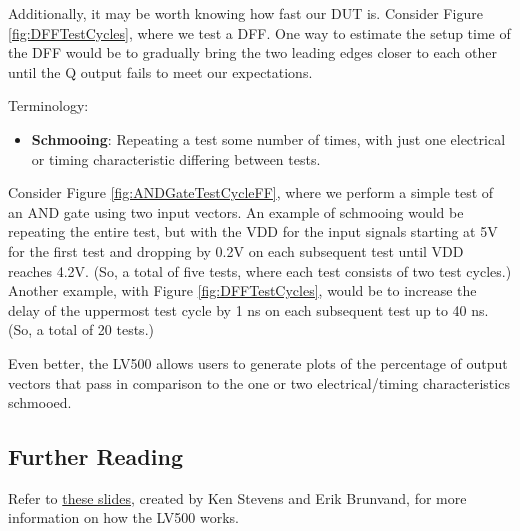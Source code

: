 Additionally, it may be worth knowing how fast our DUT is. Consider Figure \ref{fig:DFFTestCycles}, where we test a DFF. One way to estimate the setup time of the DFF would be to gradually bring the two leading edges closer to each other until the Q output fails to meet our expectations.

\begin{flushleft}
Terminology: 
\begin{itemize}
\item \textbf{Schmooing}: Repeating a test some number of times, with just one electrical or timing characteristic differing between tests.
\end{itemize}
\end{flushleft}

Consider Figure \ref{fig:ANDGateTestCycleFF}, where we perform a simple test of an AND gate using two input vectors. An example of schmooing would be repeating the entire test, but with the VDD for the input signals starting at 5V for the first test and dropping by 0.2V on each subsequent test until VDD reaches 4.2V. (So, a total of five tests, where each test consists of two test cycles.) Another example, with Figure \ref{fig:DFFTestCycles}, would be to increase the delay of the uppermost test cycle by 1 ns on each subsequent test up to 40 ns. (So, a total of 20 tests.)

Even better, the LV500 allows users to generate plots of the percentage of output vectors that pass in comparison to the one or two electrical/timing characteristics schmooed. 

\subsection{Further Reading}
Refer to \href{https://view.officeapps.live.com/op/view.aspx?src=http://www.ece.utah.edu/~kstevens/6712/tester.ppt}{these slides}, created by Ken Stevens and Erik Brunvand, for more information on how the LV500 works.

\newpage
